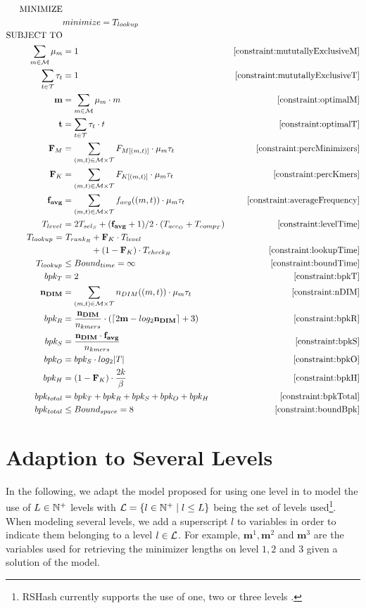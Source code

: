 \documentclass[a4paper,titlepage,onecolumn,oneside,12pt,nenglish,titlepage=firstiscover]{scrbook}
\theoremstyle{plain} %
\theoremstyle{definition} %
\theoremstyle{remark} %
\theoremstyle{plain}
\newcommand{\NN}{\mathbb{N}} %
\newcommand{\minimizerLength}{m}
\newcommand{\threshold}{t}
\newcommand{\level}{l}
\newcommand{\timeForOperationOnStructure}[2]{T_{#1_{#2}}} %
\newcommand{\possibleMinimizerLengths}{\mathcal{M}}
\newcommand{\possibleThresholds}{\mathcal{T}}
\newcommand{\indicatorm}{\mu}
\newcommand{\indicatort}{\tau}
\newcommand{\varMinimizerLength}{\textbf{\minimizerLength}}
\newcommand{\varThreshold}{\textbf{\threshold}}
\begin{document}
\begin{align*}
	\text{MINIMIZE}\\
		&\minimize = \timeForOperationOnStructure{lookup}{}\\
	\text{SUBJECT TO}\\
	\mututallyExclusiveM &\Cref{constraint:mututallyExclusiveM} \\
	\mututallyExclusiveT &\Cref{constraint:mututallyExclusiveT} \\
	\optimalM &\Cref{constraint:optimalM}\\
	\optimalT &\Cref{constraint:optimalT}\\
	\cdfMExpression &\Cref{constraint:percMinimizers}\\
	\cdfKExpression &\Cref{constraint:percKmers}\\
	\varAverageFrequencyExpression &\Cref{constraint:averageFrequency}\\
	\levelTime &\Cref{constraint:levelTime}\\
	\lookupTimeExpression &\Cref{constraint:lookupTime}\\
	\timeForOperationOnStructure{lookup}{} &\leq \boundTime = \infty &\Cref{constraint:boundTime}\\
	\bpkT &\Cref{constraint:bpkT}\\
	\nDIMExpression &\Cref{constraint:nDIM}\\
	\bpkR &\Cref{constraint:bpkR}\\
	\bpkS &\Cref{constraint:bpkS}\\
	\bpkO &\Cref{constraint:bpkO}\\
	\bpkH &\Cref{constraint:bpkH}\\
	\bpkTotal &\Cref{constraint:bpkTotal}\\
	bpk_{total} &\leq \boundSpace = 8 &\Cref{constraint:boundBpk}\\
\end{align*}


\newpage
\section{Adaption to Several Levels}\label{sec:minlp_severalLevels}
In the following, we adapt the model proposed for using one level in  to model the use of $\numberOfLevels \in \NN^+$ levels with $\setOfLevels = \{ \level \in \NN^+ \mid \level \leq \numberOfLevels \}$ being the set of levels used\footnote{RSHash currently supports the use of one, two or three levels \cite{schulte-mattler_rshash_2026}.}.\\
When modeling several levels, we add a superscript $\level$ to variables in order to indicate them belonging to a level $\level \in \setOfLevels$. For example, $\varMinimizerLength^1, \varMinimizerLength^2$ and $\varMinimizerLength^3$ are the variables used for retrieving the minimizer lengths on level $1,2$ and $3$ given a solution of the model.\\
\end{document}
